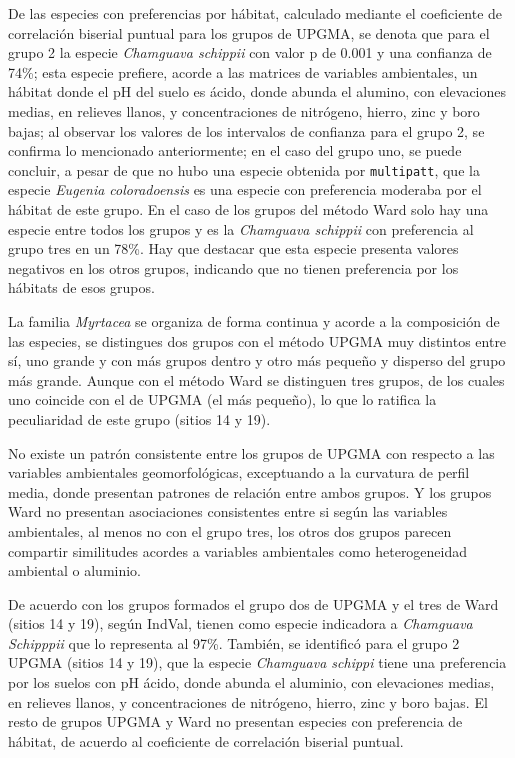 \documentclass[11pt,]{article}
\begin{document}
De las especies con preferencias por hábitat, calculado mediante el
coeficiente de correlación biserial puntual para los grupos de UPGMA, se
denota que para el grupo 2 la especie \emph{Chamguava schippii} con
valor p de 0.001 y una confianza de 74\%; esta especie prefiere, acorde
a las matrices de variables ambientales, un hábitat donde el pH del
suelo es ácido, donde abunda el alumino, con elevaciones medias, en
relieves llanos, y concentraciones de nitrógeno, hierro, zinc y boro
bajas; al observar los valores de los intervalos de confianza para el
grupo 2, se confirma lo mencionado anteriormente; en el caso del grupo
uno, se puede concluir, a pesar de que no hubo una especie obtenida por
\texttt{multipatt}, que la especie \emph{Eugenia coloradoensis} es una
especie con preferencia moderaba por el hábitat de este grupo. En el
caso de los grupos del método Ward solo hay una especie entre todos los
grupos y es la \emph{Chamguava schippii} con preferencia al grupo tres
en un 78\%. Hay que destacar que esta especie presenta valores negativos
en los otros grupos, indicando que no tienen preferencia por los
hábitats de esos grupos.

La familia \emph{Myrtacea} se organiza de forma continua y acorde a la
composición de las especies, se distingues dos grupos con el método
UPGMA muy distintos entre sí, uno grande y con más grupos dentro y otro
más pequeño y disperso del grupo más grande. Aunque con el método Ward
se distinguen tres grupos, de los cuales uno coincide con el de UPGMA
(el más pequeño), lo que lo ratifica la peculiaridad de este grupo
(sitios 14 y 19).

No existe un patrón consistente entre los grupos de UPGMA con respecto a
las variables ambientales geomorfológicas, exceptuando a la curvatura de
perfil media, donde presentan patrones de relación entre ambos grupos. Y
los grupos Ward no presentan asociaciones consistentes entre si según
las variables ambientales, al menos no con el grupo tres, los otros dos
grupos parecen compartir similitudes acordes a variables ambientales
como heterogeneidad ambiental o aluminio.

De acuerdo con los grupos formados el grupo dos de UPGMA y el tres de
Ward (sitios 14 y 19), según IndVal, tienen como especie indicadora a
\emph{Chamguava Schipppii} que lo representa al 97\%. También, se
identificó para el grupo 2 UPGMA (sitios 14 y 19), que la especie
\emph{Chamguava schippi} tiene una preferencia por los suelos con pH
ácido, donde abunda el aluminio, con elevaciones medias, en relieves
llanos, y concentraciones de nitrógeno, hierro, zinc y boro bajas. El
resto de grupos UPGMA y Ward no presentan especies con preferencia de
hábitat, de acuerdo al coeficiente de correlación biserial puntual.
\end{document}
